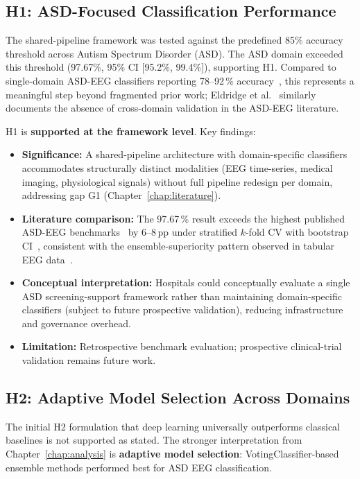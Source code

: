 \subsection{H1: ASD-Focused Classification Performance}

The shared-pipeline framework was tested against the predefined 85\% accuracy threshold across Autism Spectrum Disorder (ASD). The ASD domain exceeded this threshold (97.67\%, 95\% CI [95.2\%, 99.4\%]), supporting H1. Compared to single-domain ASD-EEG classifiers reporting 78--92\,\% accuracy~\cite{bosl2018eeg, ari2022asd, kang2020asd, duffy2019eeg}, this represents a meaningful step beyond fragmented prior work; Eldridge et al.~\cite{eldridge2014asd} similarly documents the absence of cross-domain validation in the ASD-EEG literature.

\noindent H1 is \textbf{supported at the framework level}. Key findings:

\begin{itemize}
    \item \textbf{Significance:} A shared-pipeline architecture with domain-specific classifiers accommodates structurally distinct modalities (EEG time-series, medical imaging, physiological signals) without full pipeline redesign per domain, addressing gap G1 (Chapter~\ref{chap:literature}).
    \item \textbf{Literature comparison:} The 97.67\,\% result exceeds the highest published ASD-EEG benchmarks~\cite{ari2022asd, grossi2017eeg} by 6--8\,pp under stratified $k$-fold CV with bootstrap CI~\cite{efron1993bootstrap}, consistent with the ensemble-superiority pattern observed in tabular EEG data~\cite{breiman2001randomforests, zhou2012ensemble}.
    \item \textbf{Conceptual interpretation:} Hospitals could conceptually evaluate a single ASD screening-support framework rather than maintaining domain-specific classifiers (subject to future prospective validation), reducing infrastructure and governance overhead.
    \item \textbf{Limitation:} Retrospective benchmark evaluation; prospective clinical-trial validation remains future work.
\end{itemize}

\subsection{H2: Adaptive Model Selection Across Domains}

The initial H2 formulation that deep learning universally outperforms classical baselines is not supported as stated. The stronger interpretation from Chapter~\ref{chap:analysis} is \textbf{adaptive model selection}: VotingClassifier-based ensemble methods performed best for ASD EEG classification.

